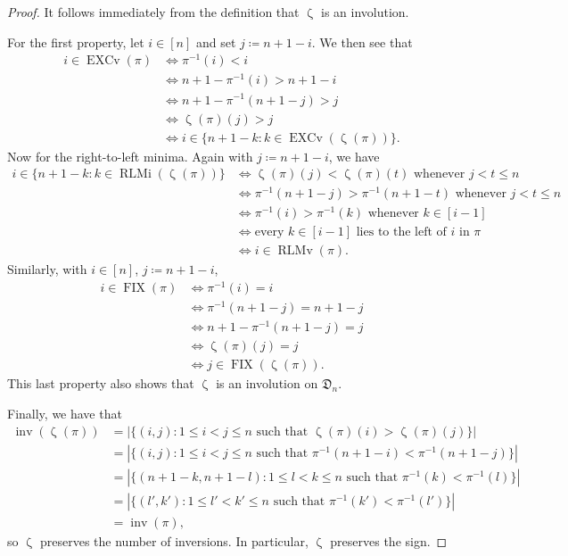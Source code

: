 \documentclass[reqno]{amsart}
\theoremstyle{definition}
\newcommand{\dArr}{\mathfrak{D}}
\DeclareMathOperator{\inv}{inv}
\DeclareMathOperator{\FIX}{FIX}
\DeclareMathOperator{\EXCv}{EXCv}
\DeclareMathOperator{\RLMv}{RLMv}
\DeclareMathOperator{\RLMi}{RLMi}
\DeclareMathOperator{\zetaMap}{\zeta}
\begin{document}
\begin{proof}
It follows immediately from the definition that $\zetaMap$ is an involution. 

For the first property, let $i\in [n]$ and set $j \coloneqq n+1-i$.
We then see that
\begin{align*}
 i\in\EXCv(\pi) &\iff \pi^{-1}(i)<i \\
                &\iff n+1-\pi^{-1}(i)>n+1-i \\
                &\iff n+1-\pi^{-1}(n+1-j)>j \\
                &\iff \zetaMap(\pi)(j)>j \\
                &\iff i\in \{n+1-k:k \in \EXCv(\zetaMap(\pi)) \}.
\end{align*}
Now for the right-to-left minima. Again with $j \coloneqq n+1-i$, we have 
\begin{align*}
i\in \{n+1-k:k \in \RLMi(\zetaMap(\pi)) \} &\iff 
\zetaMap(\pi)(j)<\zetaMap(\pi)(t) \text{ whenever } j<t \leq n \\
&\iff \pi^{-1}(n+1-j)>\pi^{-1}(n+1-t) \text{ whenever } j<t \leq n \\
&\iff \pi^{-1}(i)>\pi^{-1}(k) \text{ whenever } k\in[i-1] \\
&\iff \text{every $k\in[i-1]$ lies to the left of $i$ in $\pi$}\\
&\iff i\in\RLMv(\pi).
\end{align*}
%
Similarly, with $i \in [n]$, $j \coloneqq n+1-i$,
\begin{align*}
i\in\FIX(\pi) &\iff \pi^{-1}(i)=i \\
&\iff \pi^{-1}(n+1-j)=n+1-j\\
&\iff n+1-\pi^{-1}(n+1-j)=j\\
&\iff \zetaMap(\pi)(j)=j\\
&\iff j\in\FIX(\zetaMap(\pi)).
\end{align*} 
This last property also shows that $\zetaMap$ is an involution on $\dArr_n$.

Finally, we have that
\begin{align*}
	\inv(\zetaMap(\pi)) &= |\{ (i,j) : 1\leq i < j \leq n \text{ such that } \zetaMap(\pi)(i)>\zetaMap(\pi)(j) \}|\\
	&=|\{ (i,j) : 1\leq i < j \leq n \text{ such that }\pi^{-1}(n+1-i)<\pi^{-1}(n+1-j) \}|\\
	&=|\{ (n+1-k,n+1-l) : 1\leq l < k \leq n \text{ such that }\pi^{-1}(k)<\pi^{-1}(l) \}|\\
	&=|\{ (l',k') : 1\leq l' < k' \leq n \text{ such that }\pi^{-1}(k')<\pi^{-1}(l') \}|\\
	&=\inv(\pi),
\end{align*}
so $\zetaMap$ preserves the number of inversions.
In particular, $\zetaMap$ preserves the sign.
\end{proof}
\end{document}
